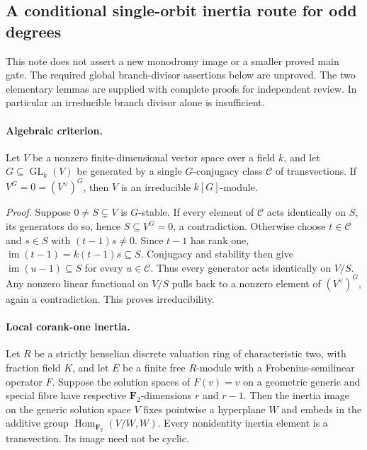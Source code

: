 \subsection*{A conditional single-orbit inertia route for odd degrees}

This note does not assert a new monodromy image or a smaller proved main
gate. The required global branch-divisor assertions below are unproved.
The two elementary lemmas are supplied with complete proofs for independent
review. In particular an irreducible branch divisor alone is insufficient.

\paragraph{Algebraic criterion.}
Let $V$ be a nonzero finite-dimensional vector space over a field $k$, and
let $G\subseteq\operatorname{GL}_k(V)$ be generated by a single
$G$-conjugacy class $\mathcal C$ of transvections. If
$V^G=0=(V^\vee)^G$, then $V$ is an irreducible $k[G]$-module.

\emph{Proof.}
Suppose $0\ne S\subsetneq V$ is $G$-stable. If every element of
$\mathcal C$ acts identically on $S$, its generators do so, hence
$S\subseteq V^G=0$, a contradiction. Otherwise choose $t\in\mathcal C$
and $s\in S$ with $(t-1)s\ne0$. Since $t-1$ has rank one,
$\operatorname{im}(t-1)=k(t-1)s\subseteq S$. Conjugacy and stability
then give $\operatorname{im}(u-1)\subseteq S$ for every
$u\in\mathcal C$. Thus every generator acts identically on $V/S$.
Any nonzero linear functional on $V/S$ pulls back to a nonzero element
of $(V^\vee)^G$, again a contradiction. This proves irreducibility.

\paragraph{Local corank-one inertia.}
Let $R$ be a strictly henselian discrete valuation ring of characteristic
two, with fraction field $K$, and let $E$ be a finite free $R$-module
with a Frobenius-semilinear operator $F$. Suppose the solution spaces
of $F(v)=v$ on a geometric generic and special fibre have respective
$\mathbf F_2$-dimensions $r$ and $r-1$. Then the inertia image on the
generic solution space $V$ fixes pointwise a hyperplane $W$ and embeds
in the additive group
$\operatorname{Hom}_{\mathbf F_2}(V/W,W)$. Every nonidentity inertia
element is a transvection. Its image need not be cyclic.

